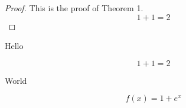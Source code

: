 \documentclass{minimal}
\begin{document}
\begin{proof}
  This is the proof of Theorem 1.
  \begin{equation}
    1+1=2
  \end{equation}
\end{proof}

Hello

\begin{equation}
  1+1=2
\end{equation}

World

\begin{equation}
  f(x) = 1 + e^x
\end{equation}
\end{document}
